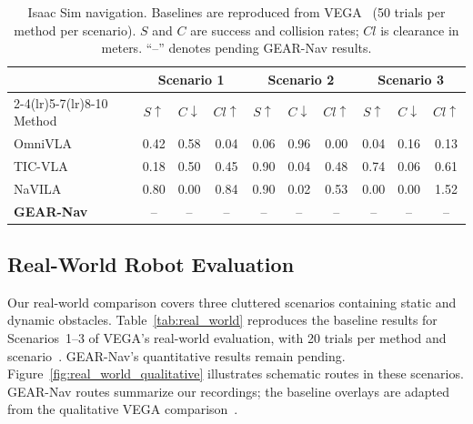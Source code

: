 \documentclass[letterpaper, 10 pt, conference]{ieeeconf}  %
\begin{document}
\begin{table}[!tb]
\centering
\caption{Isaac Sim navigation. Baselines are reproduced from
VEGA~\cite{vega} (50 trials per method per scenario).
$S$ and $C$ are success and collision rates; $Cl$ is clearance in meters.
``--'' denotes pending GEAR-Nav results.}
\label{tab:isaac_sim}
\footnotesize
\setlength{\tabcolsep}{2.5pt}
\renewcommand{\arraystretch}{1.1}
\begin{tabular}{@{}l*{9}{c}@{}}
\toprule
& \multicolumn{3}{c}{Scenario 1}
& \multicolumn{3}{c}{Scenario 2}
& \multicolumn{3}{c}{Scenario 3} \\
\cmidrule(lr){2-4}\cmidrule(lr){5-7}\cmidrule(lr){8-10}
Method
& $S\uparrow$ & $C\downarrow$ & $Cl\uparrow$
& $S\uparrow$ & $C\downarrow$ & $Cl\uparrow$
& $S\uparrow$ & $C\downarrow$ & $Cl\uparrow$ \\
\midrule
OmniVLA
& 0.42 & 0.58 & 0.04
& 0.06 & 0.96 & 0.00
& 0.04 & 0.16 & 0.13 \\
TIC-VLA
& 0.18 & 0.50 & 0.45
& 0.90 & 0.04 & 0.48
& 0.74 & 0.06 & 0.61 \\
NaVILA
& 0.80 & 0.00 & 0.84
& 0.90 & 0.02 & 0.53
& 0.00 & 0.00 & 1.52 \\
\midrule
\textbf{GEAR-Nav}
& -- & -- & --
& -- & -- & --
& -- & -- & -- \\
\bottomrule
\end{tabular}
\end{table}

\subsection{Real-World Robot Evaluation}
\label{sec:real_world}

Our real-world comparison covers three cluttered scenarios containing static
and dynamic obstacles. Table~\ref{tab:real_world} reproduces the baseline
results for Scenarios~1--3 of VEGA's real-world evaluation, with 20 trials
per method and scenario~\cite{vega}. GEAR-Nav's quantitative results remain
pending.
Figure~\ref{fig:real_world_qualitative} illustrates schematic routes in these
scenarios. GEAR-Nav routes summarize our recordings; the baseline overlays
are adapted from the qualitative VEGA comparison~\cite{vega}.
\end{document}
